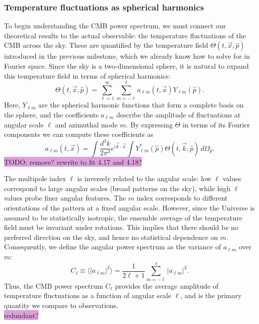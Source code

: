 \documentclass{aa}
\numberwithin{equation}{section}
\numberwithin{table}{section}
\numberwithin{figure}{section}
\begin{document}
\subsubsection{Temperature fluctuations as spherical harmonics}
To begin understanding the CMB power spectrum, we must connect our theoretical results to the actual observable: the temperature fluctuations of the CMB across the sky. These are quantified by the temperature field $\Theta(t,\vec{x},\hat{p})$ introduced in the previous milestone, which we already know how to solve for in Fourier space. 
Since the sky is a two-dimensional sphere, it is natural to expand this temperature field in terms of spherical harmonics:  
\begin{equation}
\Theta(t, \vec{x}, \hat{p}) = \sum_{\ell=1}^{\infty} \sum_{m=-\ell}^{\ell} a_{\ell m}(t, \vec{x}) Y_{\ell m}(\hat{p}).
\end{equation}
Here, $Y_{\ell m}$ are the spherical harmonic functions that form a complete basis on the sphere, and the coefficients $a_{\ell m}$ describe the amplitude of fluctuations at angular scale $\ell$ and azimuthal mode $m$. By expressing $\Theta$ in terms of its Fourier components we can compute these coefficients as
\begin{equation}
  a_{\ell m}(t,\vec{x}) = \int\frac{d^3k}{2\pi^3}e^{i\vec{k}\cdot\vec{x}}\int Y^*_{\ell m}(\hat{p})\Theta(t,\vec{k},\hat{p})\,d\Omega_{\hat{p}}. \label{eq: coeffs}
\end{equation}
\colorbox{Plum}{TODO: remove? rewrite to fit 4.17 and 4.18?}

The multipole index $\ell$ is inversely related to the angular scale: low $\ell$ values correspond to large angular scales (broad patterns on the sky), while high $\ell$ values probe finer angular features. The $m$ index corresponds to different orientations of the pattern at a fixed angular scale. However, since the Universe is assumed to be statistically isotropic, the ensemble average of the temperature field must be invariant under rotations. This implies that there should be no preferred direction on the sky, and hence no statistical dependence on $m$. Consequently, we define the angular power spectrum as the variance of $a_{\ell m}$ over $m$:  
\begin{equation}
C_\ell \equiv \langle |a_{\ell m}|^2 \rangle = \frac{1}{2\ell+1} \sum_{m=-\ell}^{\ell} |a_{\ell m}|^2.
\end{equation}
Thus, the CMB power spectrum $C_\ell$ provides the average amplitude of temperature fluctuations as a function of angular scale $\ell$, and is the primary quantity we compare to observations. \\ \colorbox{Plum}{redundant?}
\end{document}

